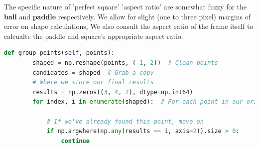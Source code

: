 \documentclass{report}
\newcommand{\pad}{\textbf{paddle}\xspace}
\newcommand{\ball}{\textbf{ball}\xspace}
\begin{document}
The specific nature of 'perfect square' 'aspect ratio' are somewhat fuzzy for the \ball and \pad respectively. We allow for slight (one to three pixel) margins of error on shape calculations, We also consult the aspect ratio of the frame itself to calcualte the paddle and square's appropriate aspect ratio. 

\begin{lstlisting}[language=python, caption={The \texttt{group_points} algorithm used in object detection}]
    def group_points(self, points):
        shaped = np.reshape(points, (-1, 2))  # Clean points
        candidates = shaped  # Grab a copy
        # Where we store our final results
        results = np.zeros((3, 4, 2), dtype=np.int64)
        for index, i in enumerate(shaped):  # For each point in our original array

            # If we've already found this point, move on
            if np.argwhere(np.any(results == i, axis=2)).size > 0:
                continue


\end{lstlisting}
\end{document}
